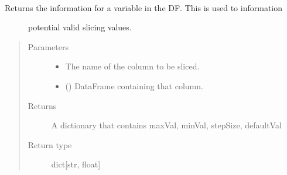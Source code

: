 \documentclass[letterpaper,10pt,openany,oneside,english]{sphinxmanual}
\begin{document}

\begin{fulllineitems}
\label{\detokenize{index:loadPullDataAnalysis.dataXformation.pickVariable}}~\begin{description}
\item[{Returns the information for a variable in the DF. This is used to information}] \leavevmode
\sphinxAtStartPar
potential valid slicing values.

\end{description}
\begin{quote}\begin{description}
\item[{Parameters}] \leavevmode\begin{itemize}
\item {} 
\sphinxAtStartPar
{} \textendash{} The name of the column to be sliced.

\item {} 
\sphinxAtStartPar
{} () \textendash{} DataFrame containing that column.

\end{itemize}

\item[{Returns}] \leavevmode
\sphinxAtStartPar
A dictionary that contains maxVal, minVal, stepSize, defaultVal

\item[{Return type}] \leavevmode
\sphinxAtStartPar
dict{[}str, float{]}

\end{description}\end{quote}

\end{fulllineitems}

\end{document}
